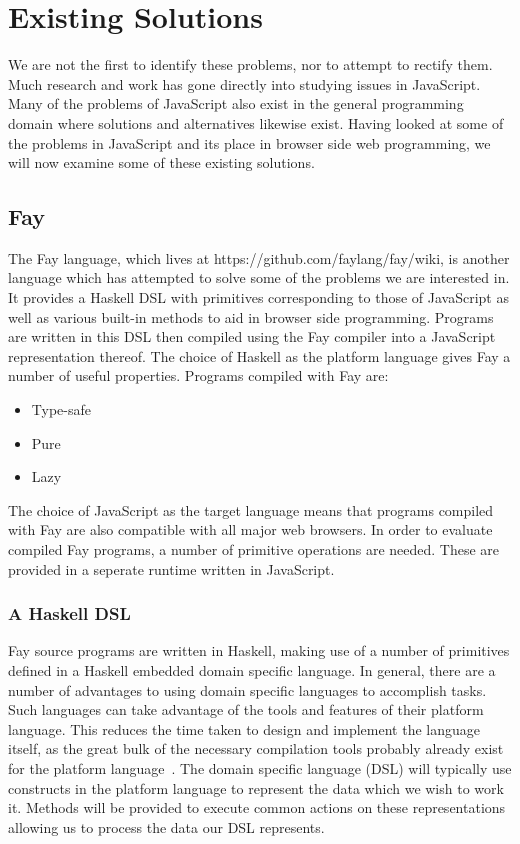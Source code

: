 
\section{Existing Solutions}
We are not the first to identify these problems, nor to attempt
to rectify them. Much research and work has gone directly into studying
issues in JavaScript. Many of the problems of JavaScript also exist
in the general programming domain where solutions and alternatives
likewise exist. Having looked at some of the problems in JavaScript 
and its place in browser side web programming, we will now examine
some of these existing solutions.


\subsection{Fay}
The Fay language, which lives at https://github.com/faylang/fay/wiki, is
another language which has attempted to solve some of the problems we
are interested in. It provides a Haskell DSL with primitives corresponding
to those of JavaScript as well as various built-in methods to aid in browser
side programming. Programs are written in this DSL then compiled using the
Fay compiler into a JavaScript representation thereof. The choice of Haskell
as the platform language gives Fay a number of useful properties. Programs 
compiled with Fay are:

\begin{itemize}
	\item Type-safe
	\item Pure
	\item Lazy
\end{itemize}

\noindent The choice of JavaScript as the target language means that programs
compiled with Fay are also compatible with all major web browsers. In order
to evaluate compiled Fay programs, a number of primitive operations
are needed. These are provided in a seperate runtime written in JavaScript.

\subsubsection{A Haskell DSL}
Fay source programs are written in Haskell, making use of a number of
primitives defined in a Haskell embedded domain specific language.
In general, there are a number of advantages to using domain specific languages
to accomplish tasks. Such languages can take advantage of the tools and 
features of their platform language. This reduces the time taken to
design and implement the language itself, as the great bulk of the necessary
compilation tools probably already exist for the platform language~\cite{DSLs}. 
The domain specific language (DSL) will typically use constructs in the
platform language to represent the data which we wish to work it. Methods
will be provided to execute common actions on these representations allowing
us to process the data our DSL represents. 

